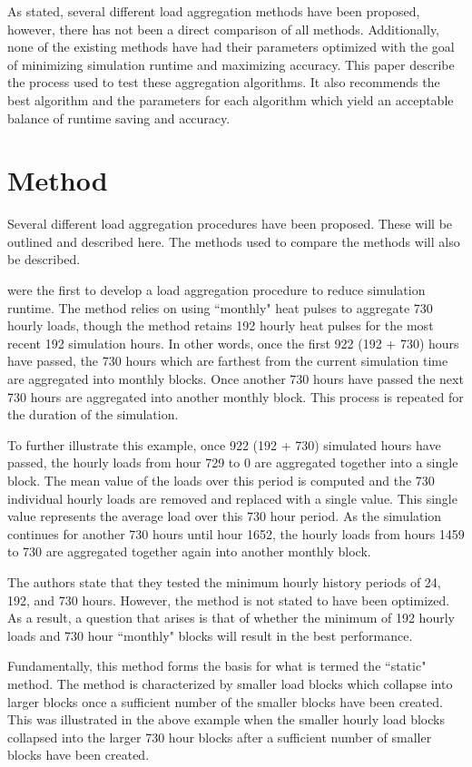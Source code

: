 \documentclass[review,12pt]{elsarticle}
\begin{document}
As stated, several different load aggregation methods have been proposed, however, there has not been a direct comparison of all methods. Additionally, none of the existing methods have had their parameters optimized with the goal of minimizing simulation runtime and maximizing accuracy. This paper describe the process used to test these aggregation algorithms. It also recommends the best algorithm and the parameters for each algorithm which yield an acceptable balance of runtime saving and accuracy.

\section*{Method}

Several different load aggregation procedures have been proposed. These will be outlined and described here. The methods used to compare the methods will also be described.

\cite{YavuzturkSpitler1999} were the first to develop a load aggregation procedure to reduce simulation runtime. The method relies on using ``monthly" heat pulses to aggregate 730 hourly loads, though the method retains 192 hourly heat pulses for the most recent 192 simulation hours. In other words, once the first 922 (192 + 730) hours have passed, the 730 hours which are farthest from the current simulation time are aggregated into monthly blocks. Once another 730 hours have passed the next 730 hours are aggregated into another monthly block. This process is repeated for the duration of the simulation.

To further illustrate this example, once 922 (192 + 730) simulated hours have passed, the hourly loads from hour 729 to 0 are aggregated together into a single block. The mean value of the loads over this period is computed and the 730 individual hourly loads are removed and replaced with a single value. This single value represents the average load over this 730 hour period. As the simulation continues for another 730 hours until hour 1652, the hourly loads from hours 1459 to 730 are aggregated together again into another monthly block.

The authors state that they tested the minimum hourly history periods of 24, 192, and 730 hours. However, the method is not stated to have been optimized. As a result, a question that arises is that of whether the minimum of 192 hourly loads and 730 hour ``monthly" blocks will result in the best performance.

Fundamentally, this method forms the basis for what is termed the ``static" method. The method is characterized by smaller load blocks which collapse into larger blocks once a sufficient number of the smaller blocks have been created. This was illustrated in the above example when the smaller hourly load blocks collapsed into the larger 730 hour blocks after a sufficient number of smaller blocks have been created. 
\end{document}
